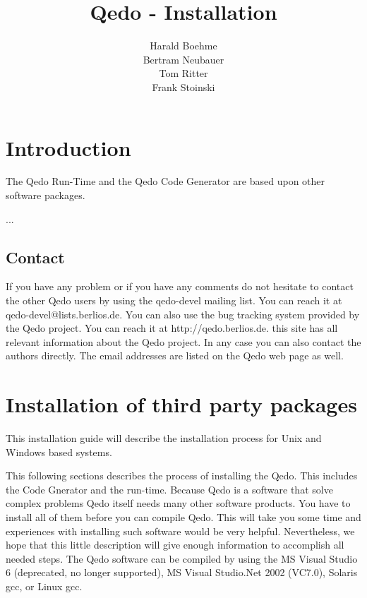 \documentclass[12pt,a4paper]{report}
\begin{document}
\title{Qedo - Installation}
\author{Harald Boehme \\ Bertram Neubauer \\ Tom Ritter \\ Frank Stoinski}

\maketitle

\setcounter{page}{1} 

\tableofcontents


\chapter{Introduction}
\label{sec:Introduction}

The Qedo Run-Time and the Qedo Code Generator are based upon other software packages. 

...

\section{Contact}
\label{sec:Contact}

If you have any problem or if you have any comments do not hesitate to contact the other Qedo users by using the qedo-devel mailing list. You can reach it at qedo-devel@lists.berlios.de. You can also use the bug tracking system provided by the Qedo project. You can reach it at http://qedo.berlios.de. this site has all relevant information about the Qedo project. In any case you can also contact the authors directly. The email addresses are listed on the Qedo web page as well.


\chapter{Installation of third party packages}
\label{sec:Installation}

This installation guide will describe the installation process for Unix and Windows based systems.

This following sections describes the process of installing the Qedo. This includes the Code Gnerator and the run-time. Because Qedo is a software that solve complex problems Qedo itself needs many other software products. You have to install all of them before you can compile Qedo. This will take you some time and experiences with installing such software would be very helpful. Nevertheless, we hope that this little description will give enough information to accomplish all needed steps. 
The Qedo software can be compiled by using the MS Visual Studio 6 (deprecated, no longer supported), MS Visual Studio.Net 2002 (VC7.0), Solaris gcc, or Linux gcc.
\end{document}
